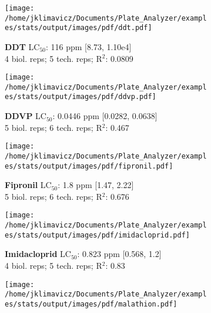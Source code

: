 \documentclass{article}
\begin{document}
\begin{figure}[thp!]
   \begin{subfigure}{0.500\textwidth}
      \centering
      \texttt{[image: /home/jklimavicz/Documents/Plate\_Analyzer/examples/stats/output/images/pdf/ddt.pdf]}
      \vspace{-0.05cm}
      \caption*{\textbf{DDT} LC$_{50}$: 116 ppm [8.73, 1.10e4] \\ 
4 biol. reps; 5 tech. reps; R$^2$: 0.0809}
      \vspace{0.1cm}
   \end{subfigure}%
   \begin{subfigure}{0.500\textwidth}
      \centering
      \texttt{[image: /home/jklimavicz/Documents/Plate\_Analyzer/examples/stats/output/images/pdf/ddvp.pdf]}
      \vspace{-0.05cm}
      \caption*{\textbf{DDVP} LC$_{50}$: 0.0446 ppm [0.0282, 0.0638] \\ 
5 biol. reps; 6 tech. reps; R$^2$: 0.467}
      \vspace{0.1cm}
   \end{subfigure}%
\vspace{-0.1cm}
   \begin{subfigure}{0.500\textwidth}
      \centering
      \texttt{[image: /home/jklimavicz/Documents/Plate\_Analyzer/examples/stats/output/images/pdf/fipronil.pdf]}
      \vspace{-0.05cm}
      \caption*{\textbf{Fipronil} LC$_{50}$: 1.8 ppm [1.47, 2.22] \\ 
5 biol. reps; 6 tech. reps; R$^2$: 0.676}
      \vspace{0.1cm}
   \end{subfigure}%
   \begin{subfigure}{0.500\textwidth}
      \centering
      \texttt{[image: /home/jklimavicz/Documents/Plate\_Analyzer/examples/stats/output/images/pdf/imidacloprid.pdf]}
      \vspace{-0.05cm}
      \caption*{\textbf{Imidacloprid} LC$_{50}$: 0.823 ppm [0.568, 1.2] \\ 
4 biol. reps; 5 tech. reps; R$^2$: 0.83}
      \vspace{0.1cm}
   \end{subfigure}%
\vspace{-0.1cm}
   \begin{subfigure}{0.500\textwidth}
      \centering
      \texttt{[image: /home/jklimavicz/Documents/Plate\_Analyzer/examples/stats/output/images/pdf/malathion.pdf]}

\end{subfigure}
\end{figure}
\end{document}
